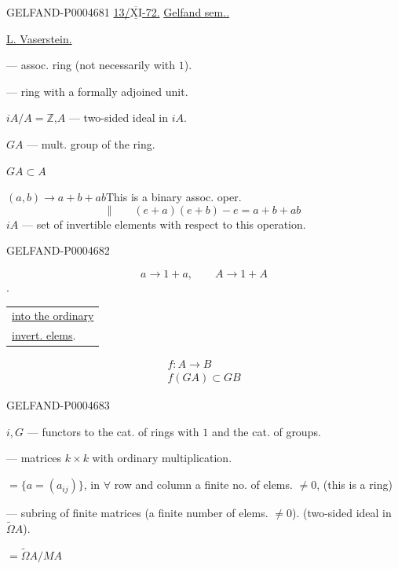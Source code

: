 \begin{GelfandAdjacentEvidence}{GELFAND-P000468}{1}
\underline{13/\mbox{$\overline{\underline{\mathrm{XI}}}$}-72.}
\quad\underline{Gelfand sem..}

\underline{L. Vaserstein.}

 — assoc. ring (not necessarily with $1$).

 — ring with a formally adjoined unit.

$iA/A=\mathbb Z$,\quad $A$ — two-sided ideal in $iA$.

$GA$ — mult. group of the ring.

$GA\subset A$

$(a,b)\longrightarrow a+b+ab$\qquad This is a binary assoc. oper.
\[
\Vert\qquad (e+a)(e+b)-e=a+b+ab
\]
\sout{\mbox{$iA$}}\quad {} — set of invertible elements with respect to this operation.
\end{GelfandAdjacentEvidence}
\begin{GelfandAdjacentEvidence}{GELFAND-P000468}{2}


\[
a\longrightarrow1+a,\qquad A\longrightarrow1+A
\]
.\quad
\begin{tabular}[t]{@{}l@{}}
\underline{into the ordinary}\\
\underline{invert. elems}.
\end{tabular}

\[
\begin{gathered}
f:A\longrightarrow B\\
f(GA)\subset GB
\end{gathered}
\]
\end{GelfandAdjacentEvidence}
\begin{GelfandAdjacentEvidence}{GELFAND-P000468}{3}


$i,G$ — functors to the cat. of rings with $1$ and the cat. of groups.

 — matrices $k\times k$ with ordinary multiplication.

$=\{a=(a_{ij})\}$,
in $\forall$ row and column a finite no. of elems. $\ne0$,
(this is a ring)

 — subring of finite matrices (a finite number of elems. $\ne0$).
(two-sided ideal in $\widetilde\Omega A$).

$=\widetilde\Omega A/MA$
\end{GelfandAdjacentEvidence}
